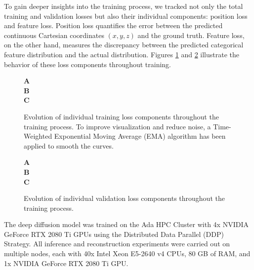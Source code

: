To gain deeper insights into the training process, we tracked not only the total training and validation losses but also their individual components: position loss and feature loss. Position loss quantifies the error between the predicted continuous Cartesian coordinates $(x, y, z)$ and the ground truth. Feature loss, on the other hand, measures the discrepancy between the predicted categorical feature distribution and the actual distribution. Figures \ref{fig:train_metrics} and \ref{fig:val_metrics} illustrate the behavior of these loss components throughout training. \\

\begin{figure}
  \center

  \textbf{\Large A}
   \\

  \textbf{\Large B}
   \\

  \textbf{\Large C}

  \caption{Evolution of individual training loss components throughout the training process. To improve visualization and reduce noise, a Time-Weighted Exponential Moving Average (EMA) algorithm has been applied to smooth the curves.}

  \label{fig:train_metrics}
\end{figure}

\begin{figure}
  \center

  \textbf{\Large A}
   \\

  \textbf{\Large B}
   \\

  \textbf{\Large C}

  \caption{Evolution of individual validation loss components throughout the training process.}

  \label{fig:val_metrics}
\end{figure}

The deep diffusion model was trained on the Ada HPC Cluster with 4x NVIDIA GeForce RTX 2080 Ti GPUs using the Distributed Data Parallel (DDP) Strategy. All inference and reconstruction experiments were carried out on multiple nodes, each with 40x Intel Xeon E5-2640 v4 CPUs, 80 GB of RAM, and 1x NVIDIA GeForce RTX 2080 Ti GPU.

